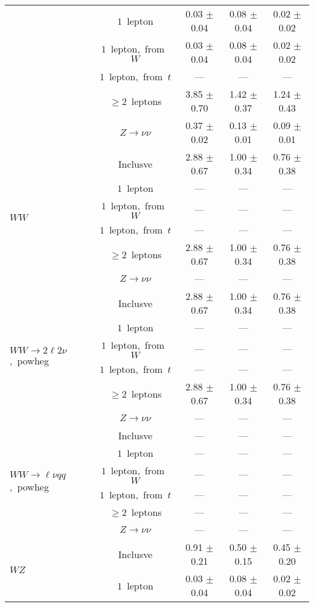 \documentclass{article}
\begin{document}
\begin{longtable}{|l|c|c|c|c|}
 & $1$~lepton  & 0.03 $\pm$ 0.04  & 0.08 $\pm$ 0.04  & 0.02 $\pm$ 0.02 \\* 
 & $1$~lepton,~from~$W$  & 0.03 $\pm$ 0.04  & 0.08 $\pm$ 0.04  & 0.02 $\pm$ 0.02 \\* 
 & $1$~lepton,~from~$t$  & ---  & ---  & --- \\* 
 & $\ge2$~leptons  & 3.85 $\pm$ 0.70  & 1.42 $\pm$ 0.37  & 1.24 $\pm$ 0.43 \\* 
 & $Z\rightarrow\nu\nu$  & 0.37 $\pm$ 0.02  & 0.13 $\pm$ 0.01  & 0.09 $\pm$ 0.01 \\* 
\hline 
\multirow{6}{*}{$WW$} & Inclusve  & 2.88 $\pm$ 0.67  & 1.00 $\pm$ 0.34  & 0.76 $\pm$ 0.38 \\* 
 & $1$~lepton  & ---  & ---  & --- \\* 
 & $1$~lepton,~from~$W$  & ---  & ---  & --- \\* 
 & $1$~lepton,~from~$t$  & ---  & ---  & --- \\* 
 & $\ge2$~leptons  & 2.88 $\pm$ 0.67  & 1.00 $\pm$ 0.34  & 0.76 $\pm$ 0.38 \\* 
 & $Z\rightarrow\nu\nu$  & ---  & ---  & --- \\* 
\hline 
\multirow{6}{*}{$WW{\rightarrow}2\ell2\nu$,~powheg} & Inclusve  & 2.88 $\pm$ 0.67  & 1.00 $\pm$ 0.34  & 0.76 $\pm$ 0.38 \\* 
 & $1$~lepton  & ---  & ---  & --- \\* 
 & $1$~lepton,~from~$W$  & ---  & ---  & --- \\* 
 & $1$~lepton,~from~$t$  & ---  & ---  & --- \\* 
 & $\ge2$~leptons  & 2.88 $\pm$ 0.67  & 1.00 $\pm$ 0.34  & 0.76 $\pm$ 0.38 \\* 
 & $Z\rightarrow\nu\nu$  & ---  & ---  & --- \\* 
\hline 
\multirow{6}{*}{$WW{\rightarrow}{\ell}{\nu}qq$,~powheg} & Inclusve  & ---  & ---  & --- \\* 
 & $1$~lepton  & ---  & ---  & --- \\* 
 & $1$~lepton,~from~$W$  & ---  & ---  & --- \\* 
 & $1$~lepton,~from~$t$  & ---  & ---  & --- \\* 
 & $\ge2$~leptons  & ---  & ---  & --- \\* 
 & $Z\rightarrow\nu\nu$  & ---  & ---  & --- \\* 
\hline 
\multirow{6}{*}{$WZ$} & Inclusve  & 0.91 $\pm$ 0.21  & 0.50 $\pm$ 0.15  & 0.45 $\pm$ 0.20 \\* 
 & $1$~lepton  & 0.03 $\pm$ 0.04  & 0.08 $\pm$ 0.04  & 0.02 $\pm$ 0.02 \\* 

\end{longtable}
\end{document}
